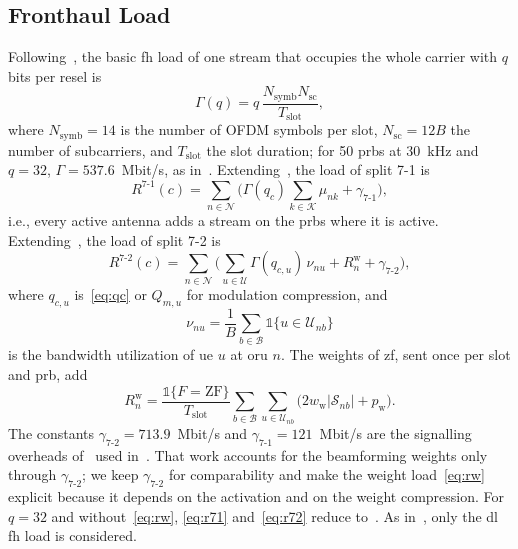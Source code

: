 \documentclass[10pt, final, journal, letterpaper, twocolumn]{IEEEtran}
\newcommand{\Nset}{\mathcal{N}}
\newcommand{\Kset}{\mathcal{K}}
\newcommand{\Uset}{\mathcal{U}}
\newcommand{\Bset}{\mathcal{B}}
\newcommand{\sone}{7\text{-}1}
\newcommand{\stwo}{7\text{-}2}
\newcommand{\ind}{\mathbb{1}}
\begin{document}
\subsection{Fronthaul Load}\label{sec:load}

Following~\cite[eq.~(9)]{girycki2024eucnc}, the basic \gls{fh} load of one stream that occupies the whole carrier with $q$ bits per \gls{resel} is
\begin{equation}
  \Gamma(q) = q\, \frac{N_{\mathrm{symb}} N_{\mathrm{sc}}}{T_{\mathrm{slot}}},
  \label{eq:gamma}
\end{equation}
where $N_{\mathrm{symb}} = 14$ is the number of OFDM symbols per slot, $N_{\mathrm{sc}} = 12B$ the number of subcarriers, and $T_{\mathrm{slot}}$ the slot duration; for 50 \glspl{prb} at 30~kHz and $q = 32$, $\Gamma = 537.6$~Mbit/s, as in~\cite{girycki2024eucnc}. Extending~\cite[eq.~(13)]{girycki2024eucnc}, the load of split 7-1 is
\begin{equation}
  R^{\sone}(c) = \sum_{n \in \Nset} \Big( \Gamma(q_c) \sum_{k \in \Kset} \mu_{nk} + \gamma_{\sone} \Big),
  \label{eq:r71}
\end{equation}
i.e., every active antenna adds a stream on the \glspl{prb} where it is active. Extending~\cite[eqs.~(10), (11)]{girycki2024eucnc}, the load of split 7-2 is
\begin{equation}
  R^{\stwo}(c) = \sum_{n \in \Nset} \Big( \sum_{u \in \Uset} \Gamma(q_{c,u})\, \nu_{nu} + R^{\mathrm{w}}_n + \gamma_{\stwo} \Big),
  \label{eq:r72}
\end{equation}
where $q_{c,u}$ is~\eqref{eq:qc} or $Q_{m,u}$ for modulation compression, and
\begin{equation}
  \nu_{nu} = \frac{1}{B} \sum_{b \in \Bset} \ind\{u \in \Uset_{nb}\}
  \label{eq:nu}
\end{equation}
is the bandwidth utilization of \gls{ue} $u$ at \gls{oru} $n$. The weights of \gls{zf}, sent once per slot and \gls{prb}, add
\begin{equation}
  R^{\mathrm{w}}_n = \frac{\ind\{F = \mathrm{ZF}\}}{T_{\mathrm{slot}}} \sum_{b \in \Bset} \sum_{u \in \Uset_{nb}} \big( 2 w_{\mathrm{w}} |\mathcal{S}_{nb}| + p_{\mathrm{w}} \big).
  \label{eq:rw}
\end{equation}
The constants $\gamma_{\stwo} = 713.9$~Mbit/s and $\gamma_{\sone} = 121$~Mbit/s are the signalling overheads of~\cite{tr38816} used in~\cite{girycki2024eucnc}. That work accounts for the beamforming weights only through $\gamma_{\stwo}$; we keep $\gamma_{\stwo}$ for comparability and make the weight load~\eqref{eq:rw} explicit because it depends on the activation and on the weight compression. For $q = 32$ and without~\eqref{eq:rw}, \eqref{eq:r71} and~\eqref{eq:r72} reduce to~\cite[eqs.~(13), (10)]{girycki2024eucnc}. As in~\cite{girycki2024eucnc}, only the \gls{dl} \gls{fh} load is considered.
\end{document}
